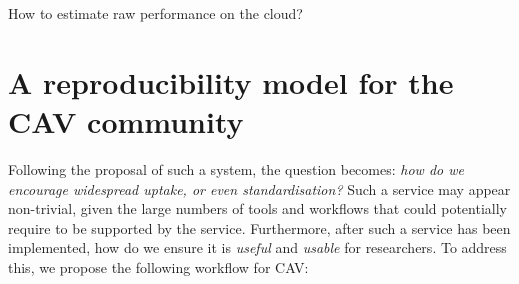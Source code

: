 \documentclass{llncs}
\begin{document}
How to estimate raw performance on the cloud?

\section{A reproducibility model for the CAV community}\label{rollout}

Following the proposal of such a system, the question becomes:
{\emph{how do we encourage widespread uptake, or even standardisation?}}
Such a service may appear non-trivial, given the large numbers of
tools and workflows
that could potentially require to be supported by the service. Furthermore,
after such a service has been implemented, how do we ensure it is
\emph{useful} and \emph{usable} for researchers. To address this, we
propose the following workflow for CAV:
\end{document}

